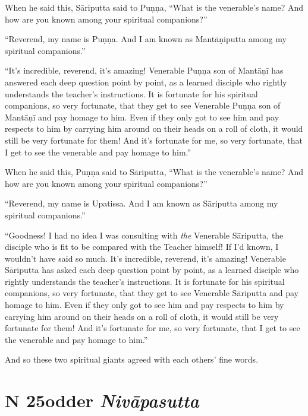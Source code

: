 \documentclass[12pt,openany]{book}%
\newcommand*{\suttatitleacronym}[1]{\smaller[2]{#1}\vspace*{.3em}}
\newcommand*{\suttatitletranslation}[1]{\linebreak{#1}}
\newcommand*{\suttatitleroot}[1]{\linebreak\smaller[2]\itshape{#1}}
\newcommand*{\tocacronym}[1]{\hspace*{-3.3em}{#1}\quad}
\newcommand*{\toctranslation}[1]{#1}
\newcommand*{\tocroot}[1]{(\textit{#1})}
\begin{document}
When he said this, \textsanskrit{Sāriputta} said to \textsanskrit{Puṇṇa}, “What is the venerable’s name? And how are you known among your spiritual companions?” 

“Reverend, my name is \textsanskrit{Puṇṇa}. And I am known as \textsanskrit{Mantāṇiputta} among my spiritual companions.” 

“It’s incredible, reverend, it’s amazing! Venerable \textsanskrit{Puṇṇa} son of \textsanskrit{Mantāṇī} has answered each deep question point by point, as a learned disciple who rightly understands the teacher’s instructions. It is fortunate for his spiritual companions, so very fortunate, that they get to see Venerable \textsanskrit{Puṇṇa} son of \textsanskrit{Mantāṇī} and pay homage to him. Even if they only got to see him and pay respects to him by carrying him around on their heads on a roll of cloth, it would still be very fortunate for them! And it’s fortunate for me, so very fortunate, that I get to see the venerable and pay homage to him.” 

When he said this, \textsanskrit{Puṇṇa} said to \textsanskrit{Sāriputta}, “What is the venerable’s name? And how are you known among your spiritual companions?” 

“Reverend, my name is Upatissa. And I am known as \textsanskrit{Sāriputta} among my spiritual companions.” 

“Goodness! I had no idea I was consulting with \emph{the} Venerable \textsanskrit{Sāriputta}, the disciple who is fit to be compared with the Teacher himself! If I’d known, I wouldn’t have said so much. It’s incredible, reverend, it’s amazing! Venerable \textsanskrit{Sāriputta} has asked each deep question point by point, as a learned disciple who rightly understands the teacher’s instructions. It is fortunate for his spiritual companions, so very fortunate, that they get to see Venerable \textsanskrit{Sāriputta} and pay homage to him. Even if they only got to see him and pay respects to him by carrying him around on their heads on a roll of cloth, it would still be very fortunate for them! And it’s fortunate for me, so very fortunate, that I get to see the venerable and pay homage to him.” 

And so these two spiritual giants agreed with each others’ fine words. 

%
\section*{{\suttatitleacronym MN 25}{\suttatitletranslation Fodder }{\suttatitleroot Nivāpasutta}}
\addcontentsline{toc}{section}{\tocacronym{MN 25} \toctranslation{Fodder } \tocroot{Nivāpasutta}}
\end{document}
